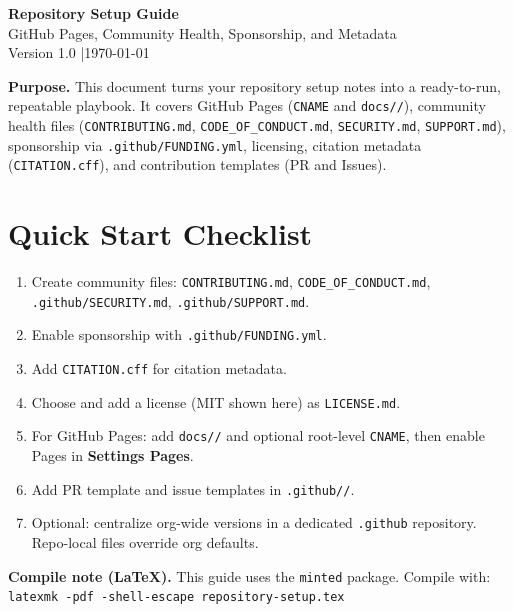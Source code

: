 \documentclass[11pt]{article}
\newcommand{\file}[1]{\texttt{#1}}
\newcommand{\dir}[1]{\texttt{#1/}}
\begin{document}
\begin{center}
{\LARGE \textbf{Repository Setup Guide}}\\[4pt]
{\large GitHub Pages, Community Health, Sponsorship, and Metadata}\\[10pt]
Version 1.0 \quad|\quad \today
\end{center}

\begin{tcolorbox}
\textbf{Purpose.} This document turns your repository setup notes into a ready-to-run, repeatable playbook. It covers GitHub Pages (\file{CNAME} and \dir{docs/}), community health files (\file{CONTRIBUTING.md}, \file{CODE\_OF\_CONDUCT.md}, \file{SECURITY.md}, \file{SUPPORT.md}), sponsorship via \file{.github/FUNDING.yml}, licensing, citation metadata (\file{CITATION.cff}), and contribution templates (PR and Issues).
\end{tcolorbox}

\tableofcontents
\newpage

\section{Quick Start Checklist}
\begin{enumerate}
  \item Create community files: \file{CONTRIBUTING.md}, \file{CODE\_OF\_CONDUCT.md}, \file{.github/SECURITY.md}, \file{.github/SUPPORT.md}.
  \item Enable sponsorship with \file{.github/FUNDING.yml}.
  \item Add \file{CITATION.cff} for citation metadata.
  \item Choose and add a license (MIT shown here) as \file{LICENSE.md}.
  \item For GitHub Pages: add \dir{docs/} and optional root-level \file{CNAME}, then enable Pages in \textbf{Settings \textrightarrow{} Pages}.
  \item Add PR template and issue templates in \dir{.github/}.
  \item Optional: centralize org-wide versions in a dedicated \file{.github} repository. Repo-local files override org defaults.
\end{enumerate}

\begin{tcolorbox}
\textbf{Compile note (LaTeX).} This guide uses the \texttt{minted} package. Compile with: \texttt{latexmk -pdf -shell-escape repository-setup.tex}
\end{tcolorbox}
\end{document}
